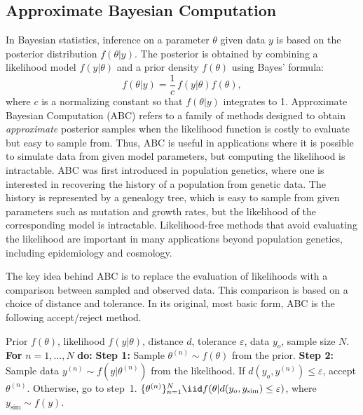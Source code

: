 \subsection{Approximate Bayesian Computation}
\label{sec:2.2.2}

In Bayesian statistics, inference on a parameter $\theta$ given data $y$ is based on the posterior distribution $f(\theta|y)$. The posterior is obtained by combining a likelihood model $f(y|\theta)$ and a prior
density $f(\theta)$ using Bayes' formula:
\[
  f(\theta|y) = \frac{1}{c}\, f(y|\theta) f(\theta),
\]
where $c$ is a normalizing constant so that $f(\theta|y)$ integrates to 1. Approximate Bayesian Computation (ABC) refers to a family of methods designed to obtain \textit{approximate} posterior samples
when the likelihood function is costly to evaluate but easy to sample from. Thus, ABC is useful
in applications where it is possible to simulate data from given model parameters, but computing the likelihood is intractable. ABC was first introduced in population genetics, where one is
interested in recovering the history of a population from genetic data. The history is represented
by a genealogy tree, which is easy to sample from given parameters such as mutation and growth
rates, but the likelihood of the corresponding model is intractable. Likelihood-free methods that
avoid evaluating the likelihood are important in many applications beyond population genetics,
including epidemiology and cosmology.

The key idea behind ABC is to replace the evaluation of likelihoods with a comparison between sampled and observed data. This comparison is based on a choice of distance and tolerance. In its original, most basic form, ABC is the following accept/reject method.

\begin{algorithm}[H]
\caption{ABC Rejection Sampler}
\label{alg:2.4}
\begin{algorithmic}[1]
\Require Prior $f(\theta)$, likelihood $f(y|\theta)$, distance $d$, tolerance $\varepsilon$, data $y_o$, sample size $N$.
\State \textbf{For} $n = 1, \ldots, N$ \textbf{do:}
\State \quad \textbf{Step 1:} Sample $\theta^{(n)} \sim f(\theta)$ from the prior.
\State \quad \textbf{Step 2:} Sample data $y^{(n)} \sim f(y|\theta^{(n)})$ from the likelihood.
\State \quad If $d(y_o, y^{(n)}) \le \varepsilon$, accept $\theta^{(n)}$. Otherwise, go to step~1.
\Ensure $\{\theta^{(n)}\}_{n=1}^N \iid f(\theta|d(y_o, y_{\mathrm{sim}}) \le \varepsilon)$, where $y_{\mathrm{sim}} \sim f(y)$.
\end{algorithmic}
\end{algorithm}


